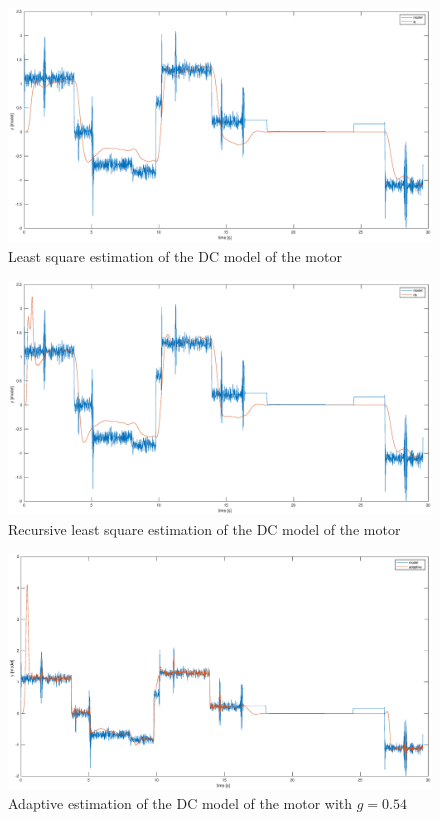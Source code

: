\documentclass[a4paper,12pt]{article}
\begin{document}
\begin{figure}[H]
    \begin{center}
        \includegraphics[scale=0.3]{images/ls.eps}
    \end{center}
    \caption{Least square estimation of the DC model of the motor}
    \label{fig:ls}
\end{figure}

\begin{figure}[H]
    \begin{center}
        \includegraphics[scale=0.3]{images/rls.eps}
    \end{center}
    \caption{Recursive least square estimation of the DC model of the motor}
    \label{fig:rls}
\end{figure}

\begin{figure}[H]
    \begin{center}
        \includegraphics[scale=0.3]{images/adaptive.eps}
    \end{center}
    \caption{Adaptive estimation of the DC model of the motor with $g = 0.54$}
    \label{fig:adaptive}
\end{figure}
\end{document}

